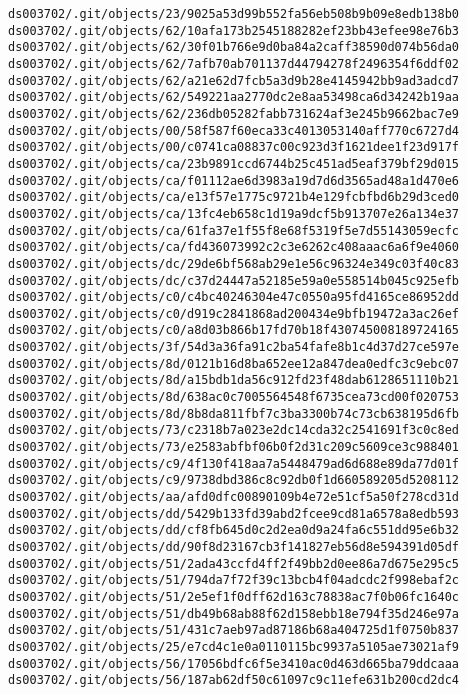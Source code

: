 \documentclass[11pt]{article}
\begin{document}
\begin{Verbatim}[commandchars=\\\{\}]
ds003702/.git/objects/23/9025a53d99b552fa56eb508b9b09e8edb138b0
ds003702/.git/objects/62/10afa173b2545188282ef23bb43efee98e76b3
ds003702/.git/objects/62/30f01b766e9d0ba84a2caff38590d074b56da0
ds003702/.git/objects/62/7afb70ab701137d44794278f2496354f6ddf02
ds003702/.git/objects/62/a21e62d7fcb5a3d9b28e4145942bb9ad3adcd7
ds003702/.git/objects/62/549221aa2770dc2e8aa53498ca6d34242b19aa
ds003702/.git/objects/62/236db05282fabb731624af3e245b9662bac7e9
ds003702/.git/objects/00/58f587f60eca33c4013053140aff770c6727d4
ds003702/.git/objects/00/c0741ca08837c00c923d3f1621dee1f23d917f
ds003702/.git/objects/ca/23b9891ccd6744b25c451ad5eaf379bf29d015
ds003702/.git/objects/ca/f01112ae6d3983a19d7d6d3565ad48a1d470e6
ds003702/.git/objects/ca/e13f57e1775c9721b4e129fcbfbd6b29d3ced0
ds003702/.git/objects/ca/13fc4eb658c1d19a9dcf5b913707e26a134e37
ds003702/.git/objects/ca/61fa37e1f55f8e68f5319f5e7d55143059ecfc
ds003702/.git/objects/ca/fd436073992c2c3e6262c408aaac6a6f9e4060
ds003702/.git/objects/dc/29de6bf568ab29e1e56c96324e349c03f40c83
ds003702/.git/objects/dc/c37d24447a52185e59a0e558514b045c925efb
ds003702/.git/objects/c0/c4bc40246304e47c0550a95fd4165ce86952dd
ds003702/.git/objects/c0/d919c2841868ad200434e9bfb19472a3ac26ef
ds003702/.git/objects/c0/a8d03b866b17fd70b18f430745008189724165
ds003702/.git/objects/3f/54d3a36fa91c2ba54fafe8b1c4d37d27ce597e
ds003702/.git/objects/8d/0121b16d8ba652ee12a847dea0edfc3c9ebc07
ds003702/.git/objects/8d/a15bdb1da56c912fd23f48dab6128651110b21
ds003702/.git/objects/8d/638ac0c7005564548f6735cea73cd00f020753
ds003702/.git/objects/8d/8b8da811fbf7c3ba3300b74c73cb638195d6fb
ds003702/.git/objects/73/c2318b7a023e2dc14cda32c2541691f3c0c8ed
ds003702/.git/objects/73/e2583abfbf06b0f2d31c209c5609ce3c988401
ds003702/.git/objects/c9/4f130f418aa7a5448479ad6d688e89da77d01f
ds003702/.git/objects/c9/9738dbd386c8c92db0f1d660589205d5208112
ds003702/.git/objects/aa/afd0dfc00890109b4e72e51cf5a50f278cd31d
ds003702/.git/objects/dd/5429b133fd39abd2fcee9cd81a6578a8edb593
ds003702/.git/objects/dd/cf8fb645d0c2d2ea0d9a24fa6c551dd95e6b32
ds003702/.git/objects/dd/90f8d23167cb3f141827eb56d8e594391d05df
ds003702/.git/objects/51/2ada43ccfd4ff2f49bb2d0ee86a7d675e295c5
ds003702/.git/objects/51/794da7f72f39c13bcb4f04adcdc2f998ebaf2c
ds003702/.git/objects/51/2e5ef1f0dff62d163c78838ac7f0b06fc1640c
ds003702/.git/objects/51/db49b68ab88f62d158ebb18e794f35d246e97a
ds003702/.git/objects/51/431c7aeb97ad87186b68a404725d1f0750b837
ds003702/.git/objects/25/e7cd4c1e0a0110115bc9937a5105ae73021af9
ds003702/.git/objects/56/17056bdfc6f5e3410ac0d463d665ba79ddcaaa
ds003702/.git/objects/56/187ab62df50c61097c9c11efe631b200cd2dc4

\end{Verbatim}
\end{document}
